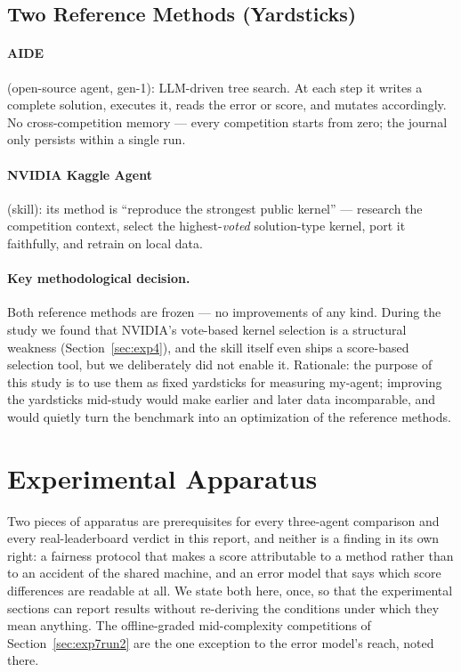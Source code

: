 \documentclass[11pt,a4paper]{article}
\begin{document}
\subsection{Two Reference Methods (Yardsticks)}

\paragraph{AIDE} (open-source agent, gen-1): LLM-driven tree search. At each step it writes a complete solution, executes it, reads the error or score, and mutates accordingly. No cross-competition memory --- every competition starts from zero; the journal only persists within a single run.

\paragraph{NVIDIA Kaggle Agent} (skill): its method is ``reproduce the strongest public kernel'' --- research the competition context, select the highest-\emph{voted} solution-type kernel, port it faithfully, and retrain on local data.

\paragraph{Key methodological decision.} Both reference methods are frozen --- no improvements of any kind. During the study we found that NVIDIA's vote-based kernel selection is a structural weakness (Section~\ref{sec:exp4}), and the skill itself even ships a score-based selection tool, but we deliberately did not enable it. Rationale: the purpose of this study is to use them as fixed yardsticks for measuring my-agent; improving the yardsticks mid-study would make earlier and later data incomparable, and would quietly turn the benchmark into an optimization of the reference methods.

\section{Experimental Apparatus}
\label{sec:apparatus}

Two pieces of apparatus are prerequisites for every three-agent comparison and every
real-leaderboard verdict in this report, and neither is a finding in its own right: a fairness
protocol that makes a score attributable to a method rather than to an accident of the shared
machine, and an error model that says which score differences are readable at all. We state
both here, once, so that the experimental sections can report results without re-deriving the
conditions under which they mean anything. The offline-graded mid-complexity competitions of
Section~\ref{sec:exp7run2} are the one exception to the error model's reach, noted there.
\end{document}
